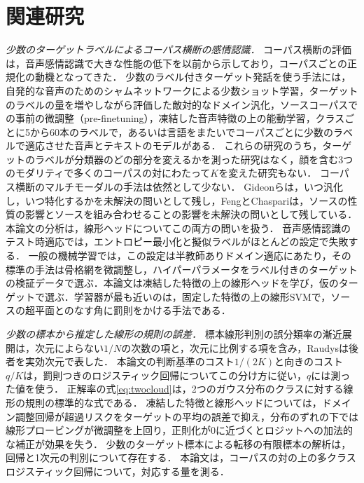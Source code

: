 \section{関連研究}
\label{sec:related}

\emph{少数のターゲットラベルによるコーパス横断の感情認識．}
コーパス横断の評価は，音声感情認識で大きな性能の低下を以前から示しており，コーパスごとの正規化の動機となってきた\cite{schuller2010crosscorpus}．
少数のラベル付きターゲット発話を使う手法には，自発的な音声のためのシャムネットワークによる少数ショット学習\cite{feng2023fewshot}，ターゲットのラベルの量を増やしながら評価した敵対的なドメイン汎化\cite{gideon2021addog}，ソースコーパスでの事前の微調整（pre-finetuning）\cite{chen2023prefinetuning}，凍結した音声特徴の上の能動学習\cite{xu2024crosstask}，クラスごとに5から60本のラベルで\cite{he2025m4ser}，あるいは言語をまたいでコーパスごとに少数のラベルで\cite{zaidi2024enhancing}適応させた音声とテキストのモデルがある．
これらの研究のうち，ターゲットのラベルが分類器のどの部分を変えるかを測った研究はなく，顔を含む3つのモダリティで多くのコーパスの対にわたって$K$を変えた研究もない．
コーパス横断のマルチモーダルの手法は依然として少ない\cite{ahn2025multitask}．
Gideonら\cite{gideon2021addog}は，いつ汎化し，いつ特化するかを未解決の問いとして残し，FengとChaspari\cite{feng2023fewshot}は，ソースの性質の影響とソースを組み合わせることの影響を未解決の問いとして残している．
本論文の分析は，線形ヘッドについてこの両方の問いを扱う．
音声感情認識のテスト時適応では，エントロピー最小化と擬似ラベルがほとんどの設定で失敗する\cite{dong2026test}．
一般の機械学習では，この設定は半教師ありドメイン適応にあたり，その標準の手法は骨格網を微調整し，ハイパーパラメータをラベル付きのターゲットの検証データで選ぶ\cite{saito2019mme,yang2021decota}．本論文は凍結した特徴の上の線形ヘッドを学び，仮のターゲットで選ぶ．学習器が最も近いのは，固定した特徴の上の線形SVMで，ソースの超平面とのなす角に罰則をかける手法である\cite{donahue2013semisupervised}．

\emph{少数の標本から推定した線形の規則の誤差．}
標本線形判別の誤分類率の漸近展開は，次元によらない$1/N$の次数の項と，次元に比例する項を含み\cite{okamoto1963asymptotic}，Raudysは後者を実効次元で表した\cite{raudys1998intrinsic}．
本論文の判断基準のコスト$1/(2K)$と向きのコスト$q/K$は，罰則つきのロジスティック回帰についてこの分け方に従い，$q$には測った値を使う．
正解率の式\eqref{eq:twocloud}は，2つのガウス分布のクラスに対する線形の規則の標準的な式である\cite{desilva2023value,dobriban2018highdimensional}．
凍結した特徴と線形ヘッドについては，ドメイン調整回帰が超過リスクをターゲットの平均の誤差で抑え\cite{rosenfeld2022domainadjusted}，分布のずれの下では線形プロービングが微調整を上回り\cite{kumar2022lpft}，正則化が0に近づくとロジットへの加法的な補正が効果を失う\cite{kini2021labelimbalanced}．
少数のターゲット標本による転移の有限標本の解析は，回帰\cite{ha2026labeled}と1次元の判別\cite{desilva2023value}について存在する．
本論文は，コーパスの対の上の多クラスロジスティック回帰について，対応する量を測る．

